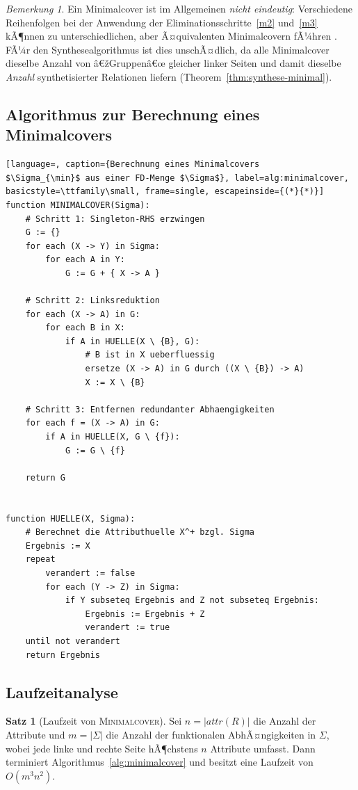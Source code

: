 ﻿\documentclass[a4paper,12pt]{report}
\theoremstyle{definition}
\newtheorem{theorem}{Satz}[chapter]
\theoremstyle{remark}
\newtheorem{remark}{Bemerkung}[chapter]
\newcommand{\att}{\mathit{attr}}
\begin{document}
\begin{remark}
Ein Minimalcover ist im Allgemeinen \emph{nicht eindeutig}: Verschiedene
Reihenfolgen bei der Anwendung der Eliminationsschritte~\ref{m2}
und~\ref{m3} kÃ¶nnen zu unterschiedlichen, aber Ã¤quivalenten
Minimalcovern fÃ¼hren \cite{Ullman1988}. FÃ¼r den Synthesealgorithmus ist
dies unschÃ¤dlich, da alle Minimalcover dieselbe Anzahl von
â€žGruppenâ€œ gleicher linker Seiten und damit dieselbe \emph{Anzahl}
synthetisierter Relationen liefern (Theorem~\ref{thm:synthese-minimal}).
\end{remark}

\subsection{Algorithmus zur Berechnung eines Minimalcovers}

\begin{lstlisting}[language=, caption={Berechnung eines Minimalcovers
$\Sigma_{\min}$ aus einer FD-Menge $\Sigma$}, label=alg:minimalcover,
basicstyle=\ttfamily\small, frame=single, escapeinside={(*}{*)}]
function MINIMALCOVER(Sigma):
    # Schritt 1: Singleton-RHS erzwingen
    G := {}
    for each (X -> Y) in Sigma:
        for each A in Y:
            G := G + { X -> A }

    # Schritt 2: Linksreduktion
    for each (X -> A) in G:
        for each B in X:
            if A in HUELLE(X \ {B}, G):
                # B ist in X ueberfluessig
                ersetze (X -> A) in G durch ((X \ {B}) -> A)
                X := X \ {B}

    # Schritt 3: Entfernen redundanter Abhaengigkeiten
    for each f = (X -> A) in G:
        if A in HUELLE(X, G \ {f}):
            G := G \ {f}

    return G


function HUELLE(X, Sigma):
    # Berechnet die Attributhuelle X^+ bzgl. Sigma
    Ergebnis := X
    repeat
        verandert := false
        for each (Y -> Z) in Sigma:
            if Y subseteq Ergebnis and Z not subseteq Ergebnis:
                Ergebnis := Ergebnis + Z
                verandert := true
    until not verandert
    return Ergebnis
\end{lstlisting}

\subsection{Laufzeitanalyse}

\begin{theorem}[Laufzeit von \textsc{Minimalcover}]
\label{thm:laufzeit-minimalcover}
Sei $n=|\att(R)|$ die Anzahl der Attribute und $m=|\Sigma|$ die Anzahl
der funktionalen AbhÃ¤ngigkeiten in $\Sigma$, wobei jede linke und
rechte Seite hÃ¶chstens $n$ Attribute umfasst. Dann terminiert
Algorithmus~\ref{alg:minimalcover} und besitzt eine Laufzeit von
$O(m^3 n^2)$.
\end{theorem}
\end{document}
